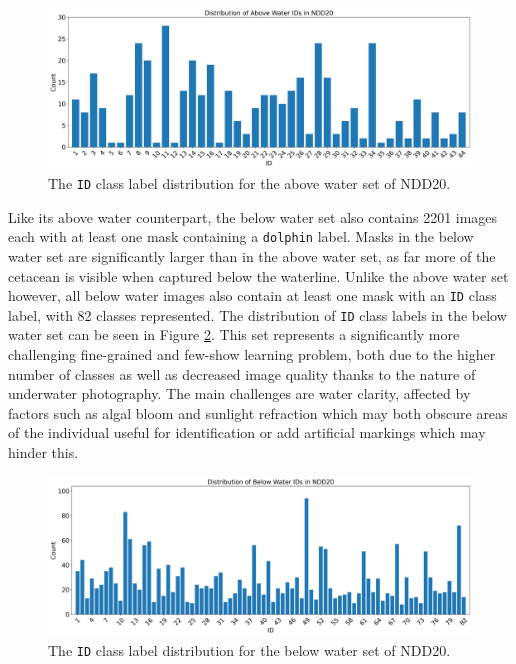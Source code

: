 \begin{figure}
	\begin{center}
		\includegraphics[width=\linewidth]{Chapter3/figs/aboveWaterIDDist_updated.png}
	\end{center}
	\caption{The \texttt{ID} class label distribution for the above water set of NDD20.}
	\label{fig:above-water-id-dist}
\end{figure}

Like its above water counterpart, the below water set also contains 2201 images each with at least one mask containing  a \texttt{dolphin} label. Masks in the below water set are significantly larger than in the above water set, as far more of the cetacean is visible when captured below the waterline. Unlike the above water set however, all below water images also contain at least one mask with an \texttt{ID} class label, with 82 classes represented. The distribution of \texttt{ID} class labels in the below water set can be seen in Figure \ref{fig:below-water-id-dist}. This set represents a significantly more challenging fine-grained and few-show learning problem, both due to the higher number of classes as well as decreased image quality thanks to the nature of underwater photography. The main challenges are water clarity, affected by factors such as algal bloom and sunlight refraction which may both obscure areas of the individual useful for identification or add artificial markings which may hinder this. 

\begin{figure}
	\begin{center}
		\includegraphics[width=\linewidth]{Chapter3/figs/belowWaterIDDist_updated.png}
	\end{center}
	\caption{The \texttt{ID} class label distribution for the below water set of NDD20.}
	\label{fig:below-water-id-dist}
\end{figure}

